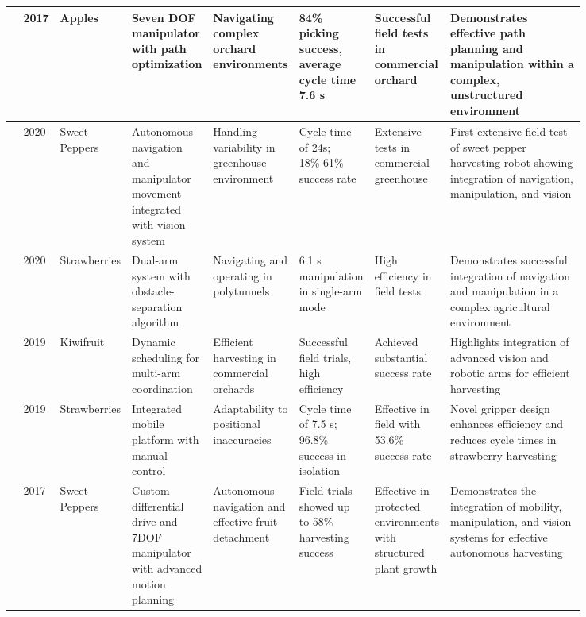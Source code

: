 \documentclass[a4paper,fleqn]{cas-dc}
\begin{document}
\begin{table}
\begin{tabular}{p{0.025\linewidth} p{0.025\linewidth} p{0.07\linewidth} p{0.12\linewidth} p{0.12\linewidth} p{0.12\linewidth} p{0.12\linewidth} p{0.24\linewidth}}
\cite{silwal2017design} & 2017 & Apples & Seven DOF manipulator with path optimization & Navigating complex orchard environments & 84\% picking success, average cycle time 7.6 s & Successful field tests in commercial orchard & Demonstrates effective path planning and manipulation within a complex, unstructured environment \\ \midrule
\cite{arad2020development} & 2020 & Sweet Peppers & Autonomous navigation and manipulator movement integrated with vision system & Handling variability in greenhouse environment & Cycle time of 24s; 18\%-61\% success rate & Extensive tests in commercial greenhouse & First extensive field test of sweet pepper harvesting robot showing integration of navigation, manipulation, and vision \\ \midrule
\cite{xiong2020autonomous} & 2020 & Strawberries & Dual-arm system with obstacle-separation algorithm & Navigating and operating in polytunnels & 6.1 s manipulation in single-arm mode & High efficiency in field tests & Demonstrates successful integration of navigation and manipulation in a complex agricultural environment \\ \midrule
\cite{williams2019robotic} & 2019 & Kiwifruit & Dynamic scheduling for multi-arm coordination & Efficient harvesting in commercial orchards & Successful field trials, high efficiency & Achieved substantial success rate & Highlights integration of advanced vision and robotic arms for efficient harvesting \\ \midrule
\cite{xiong2019development} & 2019 & Strawberries & Integrated mobile platform with manual control & Adaptability to positional inaccuracies & Cycle time of 7.5 s; 96.8\% success in isolation & Effective in field with 53.6\% success rate & Novel gripper design enhances efficiency and reduces cycle times in strawberry harvesting \\ \midrule
\cite{lehnert2017autonomous} & 2017 & Sweet Peppers & Custom differential drive and 7DOF manipulator with advanced motion planning & Autonomous navigation and effective fruit detachment & Field trials showed up to 58\% harvesting success & Effective in protected environments with structured plant growth & Demonstrates the integration of mobility, manipulation, and vision systems for effective autonomous harvesting \\ \midrule

\end{tabular}
\end{table}
\end{document}
